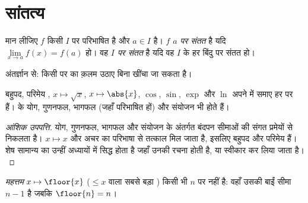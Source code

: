 \section{सांतत्य}

\begin{definition}[सांतत्य]\label{def:g12:limcont:continuity}
मान लीजिए $f$ किसी  $I$ पर परिभाषित है और $a \in I$ है।  $f$
\emph{$a$ पर संतत} है यदि $\lim\limits_{x \to a} f(x) = f(a)$ हो। वह \emph{$I$ पर
संतत} है यदि वह $I$ के हर बिंदु पर संतत हो।
\end{definition}

अंतर्ज्ञान से: किसी  पर   का  क़लम उठाए बिना खींचा जा सकता
है।

\begin{proposition}[सामान्य फलनों का सांतत्य]\label{prop:g12:limcont:usual}
बहुपद, परिमेय , $x \mapsto \sqrt{x}$, $x \mapsto \abs{x}$, $\cos$, $\sin$, $\exp$ और $\ln$ अपने  में
समाए हर  पर  हैं।   के योग, गुणनफल, भागफल (जहाँ परिभाषित
हों) और संयोजन भी  होते हैं।
\end{proposition}

\begin{proof}[आंशिक उपपत्ति]
योग, गुणनफल, भागफल और संयोजन के अंतर्गत बंदपन सीमाओं की संगत प्रमेयों से
निकलता है। $x \mapsto x$ और अचर  का  परिभाषा से तत्काल मिल जाता है, इसलिए
बहुपद और परिमेय   हैं। शेष सामान्य  का  उन्हीं अध्यायों
में सिद्ध होता है जहाँ उनकी रचना होती है, या स्वीकार कर लिया जाता है।
\end{proof}

\begin{example}
\emph{महत्तम  } $x \mapsto \floor{x}$ ($\leq x$ वाला सबसे बड़ा ) किसी भी
 $n$ पर  नहीं है: वहाँ उसकी बाईं सीमा $n - 1$ है जबकि $\floor{n} = n$।
\end{example}

